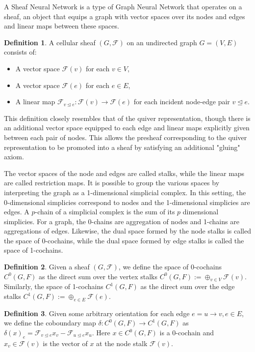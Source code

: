 \documentclass{article}
\theoremstyle{definition}
\newtheorem{definition}{Definition}[section]
\begin{document}
A Sheaf Neural Network is a type of Graph Neural Network that operates on a sheaf, an object that equips a graph with vector spaces over its nodes and edges and linear maps between these spaces.

\begin{definition}
A cellular sheaf $(G, \mathcal{F})$ on an undirected
graph $G = (V, E)$ consists of:
\begin{itemize}
    \item  A vector space $\mathcal{F}(v)$ for each $v \in V$,
    \item  A vector space $\mathcal{F}(e)$ for each $e  \in E$,
    \item A linear map $\mathcal{F}_{v \unlhd e} : \mathcal{F}(v) \to \mathcal{F}(e)$ for each incident node-edge pair $v \unlhd e$.
\end{itemize}
\end{definition}

This definition closely resembles that of the quiver representation, though there is an additional vector space equipped to each edge and linear maps explicitly given between each pair of nodes.
This allows the presheaf corresponding to the quiver representation to be promoted into a sheaf by satisfying an additional "gluing" axiom.

The vector spaces of the node and edges are called stalks, while the linear maps are called restriction maps. It is possible to group the various spaces by interpreting the graph as a 1-dimensional simplicial complex. In this setting, the 0-dimensional simplicies correspond to nodes and the 1-dimensional simplicies are edges. A $p$-chain of a simplicial complex is the sum of its $p$ dimensional simplicies. For a graph, the 0-chains are aggregation of nodes and 1-chains are aggregations of edges. Likewise, the dual space formed by the node stalks is called the space of 0-cochains, while the dual space formed by edge stalks is called the space of 1-cochains.  

\begin{definition}
    Given a sheaf $(G, \mathcal{F})$, we define the space
of $0$-cochains $C^0(G, F)$ as the direct sum over the vertex
stalks $C^0 (G, F) := \oplus_{v\in V} \mathcal{F}(v)$. Similarly, the space of 1-cochains $C^1(G, F)$ as the direct sum over the edge stalks $C^1(G, F) := \oplus_{e\in E} \mathcal{F}(e)$.
\end{definition}

\begin{definition}
    Given some arbitrary orientation for each edge $e = u \to v, e \in E$, we define the coboundary map $\delta : C^0 (G, F) \to C^1(G, F)$ as $\delta(x)_e = \mathcal{F}_{v \unlhd e} x_v - \mathcal{F}_{u \unlhd e} x_u$.
    Here $x \in C^0(G, F)$ is a 0-cochain and $x_v \in \mathcal{F}(v)$ is the vector of $x$ at the node stalk $\mathcal{F}(v)$.
\end{definition}
\end{document}

